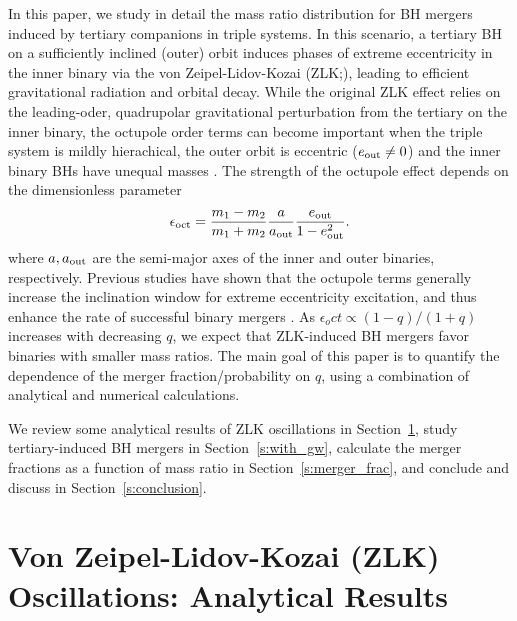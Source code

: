 \documentclass[
        fleqn,
        usenatbib,
    ]{mnras}
\begin{document}
In this paper, we study in detail the mass ratio distribution for BH mergers
induced by tertiary companions in triple systems. In this scenario, a tertiary
BH on a sufficiently inclined (outer) orbit induces phases of extreme
eccentricity in the inner binary via the von Zeipel-Lidov-Kozai
(ZLK;\@\citealp{zeipel, lidov, kozai}), leading to efficient gravitational
radiation and orbital decay.  While the original ZLK effect relies on the
leading-oder, quadrupolar gravitational perturbation from the tertiary on the
inner binary, the octupole order terms can become important when the triple
system is mildly hierachical, the outer orbit is eccentric ($e_{\rm out} \neq 0$)
and the inner binary BHs have unequal masses \citep[e.g.,][]{ford2000secular,
blaes2002kozai, lithwick2011eccentric, LML15}. The strength of the
octupole effect depends on the dimensionless parameter
\begin{equation}
    \epsilon_{\rm oct} = \frac{m_1 - m_2}{m_1 + m_2} \frac{a}{a_{\rm out}}
        \frac{e_{\rm out}}{1 - e_{\rm out}^2}.\label{eq:eps_oct}
\end{equation}
where $a, a_{\rm out}$ are the semi-major axes of the inner and outer binaries,
respectively. Previous studies have shown that the octupole terms generally
increase the inclination window for extreme eccentricity excitation, and thus
enhance the rate of successful binary mergers \citep{LL18}. As $\epsilon_oct
\propto (1-q)/(1+q)$ increases with decreasing $q$, we expect that ZLK-induced
BH mergers favor binaries with smaller mass ratios. The main goal of this paper
is to quantify the dependence of the merger fraction/probability on $q$, using a
combination of analytical and numerical calculations.

We review some analytical results of ZLK oscillations in
Section~\ref{s:background}, study tertiary-induced BH mergers in
Section~\ref{s:with_gw}, calculate the merger fractions as a function of mass
ratio in Section~\ref{s:merger_frac}, and conclude and discuss in
Section~\ref{s:conclusion}.

\section{Von Zeipel-Lidov-Kozai (ZLK) Oscillations: Analytical
Results}\label{s:background}
\end{document}
